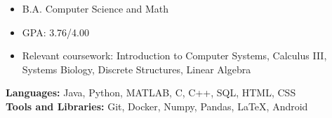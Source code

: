 \documentclass[a4paper]{resume}
\begin{document}
\vspace*{-20pt}



\vspace{10pt}

\begin{itemize} \vspace{-5pt} \itemsep -2pt
	\item B.A. Computer Science and Math
	\item GPA: 3.76/4.00
	\item Relevant coursework: Introduction to Computer Systems, Calculus III, Systems Biology, Discrete Structures, Linear Algebra
\end{itemize}
\enresection

\vspace{-2pt}

\textbf{Languages:} Java, Python, MATLAB, C, C++, SQL, HTML, CSS \\
\textbf{Tools and Libraries:} Git, Docker, Numpy, Pandas, LaTeX, Android
\enresection

\vspace{3pt}
\end{document}
